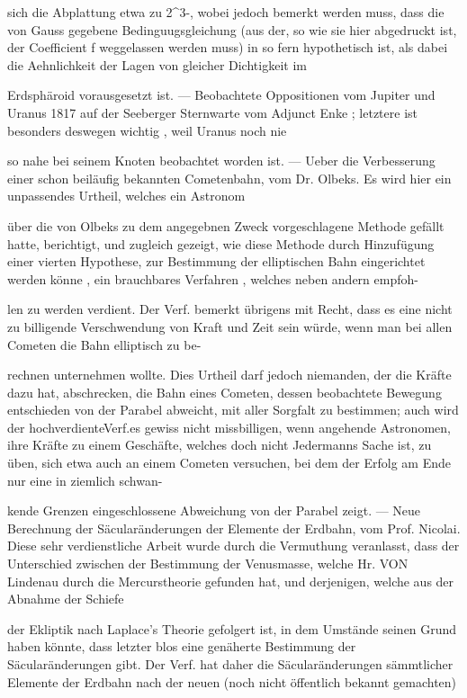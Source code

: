 \documentclass[10pt,a4paper]{article}
\begin{document}
sich die Abplattung etwa zu 2\textasciicircum{}3-, wobei jedoch bemerkt werden muss, dass die von Gauss gegebene Bedinguugsgleichung (aus der, so wie sie hier abgedruckt ist, der Coefficient f weggelassen werden muss) in so fern hypothetisch ist, als dabei die Aehnlichkeit der Lagen von gleicher Dichtigkeit im

Erdsphäroid vorausgesetzt ist. — Beobachtete Oppositionen vom Jupiter und Uranus 1817 auf der Seeberger Sternwarte vom Adjunct Enke ; letztere ist besonders deswegen wichtig , weil Uranus noch nie

so nahe bei seinem Knoten beobachtet worden ist. — Ueber die Verbesserung einer schon beiläufig bekannten Cometenbahn, vom Dr. Olbeks. Es wird hier ein unpassendes Urtheil, welches ein Astronom

über die von Olbeks zu dem angegebnen Zweck vorgeschlagene Methode gefällt hatte, berichtigt, und zugleich gezeigt, wie diese Methode durch Hinzufügung einer vierten Hypothese, zur Bestimmung der elliptischen Bahn eingerichtet werden könne , ein brauchbares Verfahren , welches neben andern empfoh-

len zu werden verdient. Der Verf. bemerkt übrigens mit Recht, dass es eine nicht zu billigende Verschwendung von Kraft und Zeit sein würde, wenn man bei allen Cometen die Bahn elliptisch zu be-

rechnen unternehmen wollte. Dies Urtheil darf jedoch niemanden, der die Kräfte dazu hat, abschrecken, die Bahn eines Cometen, dessen beobachtete Bewegung entschieden von der Parabel abweicht, mit aller Sorgfalt zu bestimmen; auch wird der hochverdienteVerf.es gewiss nicht missbilligen, wenn angehende Astronomen, ihre Kräfte zu einem Geschäfte, welches doch nicht Jedermanns Sache ist, zu üben, sich etwa auch an einem Cometen versuchen, bei dem der Erfolg am Ende nur eine in ziemlich schwan-

kende Grenzen eingeschlossene Abweichung von der Parabel zeigt. — Neue Berechnung der Säcularänderungen der Elemente der Erdbahn, vom Prof. Nicolai. Diese sehr verdienstliche Arbeit wurde durch die Vermuthung veranlasst, dass der Unterschied zwischen der Bestimmung der Venusmasse, welche Hr. VON Lindenau durch die Mercurstheorie gefunden hat, und derjenigen, welche aus der Abnahme der Schiefe

der Ekliptik nach Laplace's Theorie gefolgert ist, in dem Umstände seinen Grund haben könnte, dass letzter blos eine genäherte Bestimmung der Säcularänderungen gibt. Der Verf. hat daher die Säcularänderungen sämmtlicher Elemente der Erdbahn nach der neuen (noch nicht öffentlich bekannt gemachten)
\end{document}

